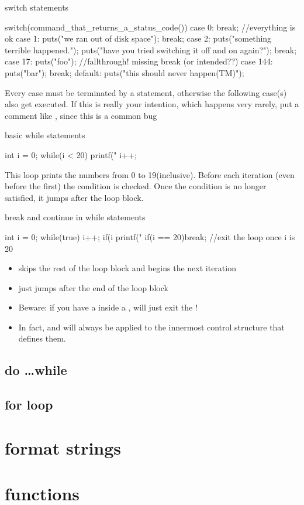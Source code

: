 \documentclass[10pt,graphics,aspectratio=169,table]{beamer}
\begin{document}
\begin{frame}[fragile]{switch statements}
    \begin{codeblock}
switch(command_that_returns_a_status_code()){
    case 0: break; //everything is ok
    case 1: puts("we ran out of disk space"); break;
    case 2: {
        puts("something terrible happened.");
        puts("have you tried switching it off and on again?");
    }break;
    case 17: puts("foo"); //fallthrough! missing break (or intended??)
    case 144: puts("bar"); break;
    default: puts("this should never happen(TM)");
}
    \end{codeblock}
    Every case must be terminated by a  statement, otherwise the 
    following case(s) also get executed. If this is really your intention,
    which happens very rarely, put a comment like , 
    since this is a common bug
\end{frame}

\begin{frame}[fragile]{basic while statements}
    \begin{codeblock}
int i = 0;
while(i < 20){
    printf("%
    i++;
}
    \end{codeblock}

    This loop prints the numbers from 0 to 19(inclusive).
    Before each iteration (even before the first) the condition is checked.
    Once the condition is no longer satisfied, it jumps after the loop block.
\end{frame}
\begin{frame}[fragile]{break and continue in while statements}
    \begin{codeblock}
int i = 0;
while(true){
    i++; 
    if(i %
    printf("%
    if(i == 20)break; //exit the loop once i is 20
}
    \end{codeblock} 
    \begin{itemize}
        \item
             skips the rest of the loop block and begins
            the next iteration
        \item {} just jumps after the end of the loop block
        \item 
            Beware: if you have a  inside a ,
             will just exit the !
        \item 
            In fact,  and  will always be applied to
            the innermost control structure that defines them. 
    \end{itemize}
\end{frame}

\subsection{do \ldots while}

\subsection{for loop}

\section{format strings}

\section{functions}
\end{document}
